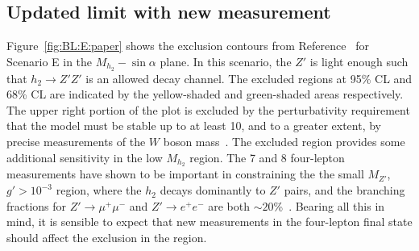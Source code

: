 \subsection{Updated \contur limit with new \mFourL{} measurement}
Figure~\ref{fig:BL:E:paper} shows the exclusion contours from Reference~\cite{BLcontur} for Scenario E in the $M_{h_2}-\sin\alpha$ plane. In this scenario, the $Z'$ is light enough such that $h_2 \rightarrow Z'Z'$ is an allowed decay channel. The excluded regions at 95\% CL and 68\% CL are indicated by the yellow-shaded and green-shaded areas respectively. The upper right portion of the plot is excluded by the perturbativity requirement that the model must be stable up to at least \unit{10}{\TeV}, and to a greater extent, by precise measurements of the $W$ boson mass~\cite{BLcontur}. The \contur excluded region provides some additional sensitivity in the low $M_{h_2}$ region. The \unit{7}{\TeV} and \unit{8}{\TeV} four-lepton measurements have shown to be important in constraining the the small $M_{Z'}$, $g'>10^{-3}$ region, where the $h_2$ decays dominantly to $Z'$ pairs, and the branching fractions for $Z'\rightarrow\mu^+\mu^-$ and $Z'\rightarrow e^+e^-$ are both $\sim20$\%~\cite{BLcontur}. Bearing all this in mind, it is sensible to expect that new measurements in the four-lepton final state should affect the exclusion in the region.

